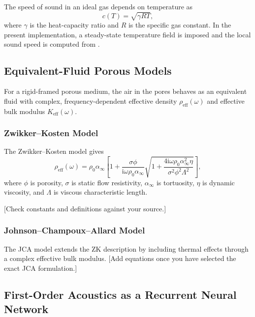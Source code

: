 The speed of sound in an ideal gas depends on temperature as
\begin{equation}
    c(T) = \sqrt{\gamma R T},
\label{eq:sound_speed_temperature}
\end{equation}
where $\gamma$ is the heat-capacity ratio and $R$ is the specific gas constant. In the present implementation, a steady-state temperature field is imposed and the local sound speed is computed from .

\subsection{Equivalent-Fluid Porous Models}
\label{subsec:porous_models}

For a rigid-framed porous medium, the air in the pores behaves as an equivalent fluid with complex, frequency-dependent effective density $\rho_\mathrm{eff}(\omega)$ and effective bulk modulus $K_\mathrm{eff}(\omega)$.

\subsubsection{Zwikker--Kosten Model}

The Zwikker--Kosten model gives
\begin{equation}
    \rho_\mathrm{eff}(\omega) = \rho_0 \alpha_\infty \left[ 1 + \frac{\sigma \phi}{\mathrm{i} \omega \rho_0 \alpha_\infty} \sqrt{1 + \frac{4 \mathrm{i} \omega \rho_0 \alpha_\infty^2 \eta}{\sigma^2 \phi^2 \Lambda^2}} \right],
\end{equation}
where $\phi$ is porosity, $\sigma$ is static flow resistivity, $\alpha_\infty$ is tortuosity, $\eta$ is dynamic viscosity, and $\Lambda$ is viscous characteristic length.

[Check constants and definitions against your source.]

\subsubsection{Johnson--Champoux--Allard Model}

The JCA model extends the ZK description by including thermal effects through a complex effective bulk modulus. [Add equations once you have selected the exact JCA formulation.]

\subsection{First-Order Acoustics as a Recurrent Neural Network}
\label{subsec:acoustics_rnn}

